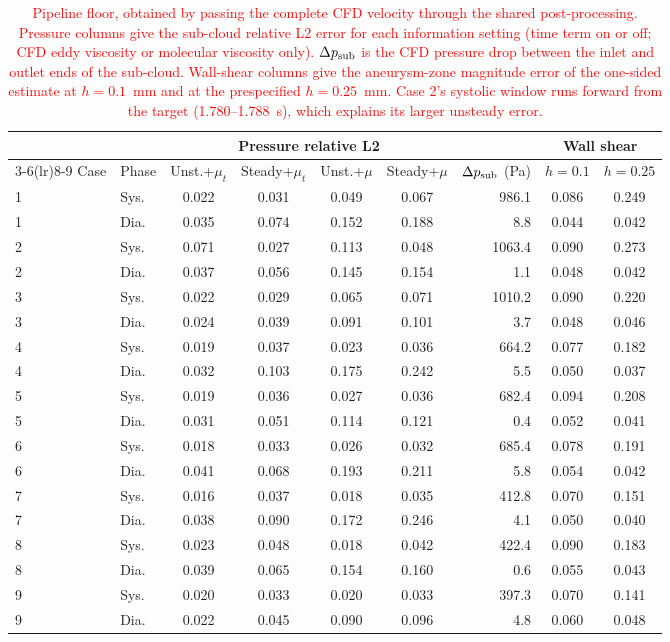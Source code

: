 \documentclass[12pt,a4paper]{article}
\theoremstyle{definition}
\numberwithin{equation}{section}
\begin{document}
\begin{table}[htbp]
\centering
\small
\setlength{\tabcolsep}{4pt}
\caption{\textcolor{red}{Pipeline floor, obtained by passing the complete CFD velocity through the shared post-processing. Pressure columns give the sub-cloud relative L2 error for each information setting (time term on or off; CFD eddy viscosity or molecular viscosity only). $\Delta p_{\rm sub}$ is the CFD pressure drop between the inlet and outlet ends of the sub-cloud. Wall-shear columns give the aneurysm-zone magnitude error of the one-sided estimate at $h=0.1$~mm and at the prespecified $h=0.25$~mm. Case 2's systolic window runs forward from the target (1.780--1.788~s), which explains its larger unsteady error.}}
\label{tab:reference_floor}
\begin{tabular}{llccccrcc}
\toprule
 & & \multicolumn{4}{c}{Pressure relative L2} & & \multicolumn{2}{c}{Wall shear} \\
\cmidrule(lr){3-6}\cmidrule(lr){8-9}
Case & Phase & Unst.+$\mu_t$ & Steady+$\mu_t$ & Unst.+$\mu$ & Steady+$\mu$ & $\Delta p_{\rm sub}$ (Pa) & $h=0.1$ & $h=0.25$ \\
\midrule
1 & Sys. & 0.022 & 0.031 & 0.049 & 0.067 & 986.1 & 0.086 & 0.249 \\
1 & Dia. & 0.035 & 0.074 & 0.152 & 0.188 & 8.8 & 0.044 & 0.042 \\
2 & Sys. & 0.071 & 0.027 & 0.113 & 0.048 & 1063.4 & 0.090 & 0.273 \\
2 & Dia. & 0.037 & 0.056 & 0.145 & 0.154 & 1.1 & 0.048 & 0.042 \\
3 & Sys. & 0.022 & 0.029 & 0.065 & 0.071 & 1010.2 & 0.090 & 0.220 \\
3 & Dia. & 0.024 & 0.039 & 0.091 & 0.101 & 3.7 & 0.048 & 0.046 \\
4 & Sys. & 0.019 & 0.037 & 0.023 & 0.036 & 664.2 & 0.077 & 0.182 \\
4 & Dia. & 0.032 & 0.103 & 0.175 & 0.242 & 5.5 & 0.050 & 0.037 \\
5 & Sys. & 0.019 & 0.036 & 0.027 & 0.036 & 682.4 & 0.094 & 0.208 \\
5 & Dia. & 0.031 & 0.051 & 0.114 & 0.121 & 0.4 & 0.052 & 0.041 \\
6 & Sys. & 0.018 & 0.033 & 0.026 & 0.032 & 685.4 & 0.078 & 0.191 \\
6 & Dia. & 0.041 & 0.068 & 0.193 & 0.211 & 5.8 & 0.054 & 0.042 \\
7 & Sys. & 0.016 & 0.037 & 0.018 & 0.035 & 412.8 & 0.070 & 0.151 \\
7 & Dia. & 0.038 & 0.090 & 0.172 & 0.246 & 4.1 & 0.050 & 0.040 \\
8 & Sys. & 0.023 & 0.048 & 0.018 & 0.042 & 422.4 & 0.090 & 0.183 \\
8 & Dia. & 0.039 & 0.065 & 0.154 & 0.160 & 0.6 & 0.055 & 0.043 \\
9 & Sys. & 0.020 & 0.033 & 0.020 & 0.033 & 397.3 & 0.070 & 0.141 \\
9 & Dia. & 0.022 & 0.045 & 0.090 & 0.096 & 4.8 & 0.060 & 0.048 \\
\bottomrule
\end{tabular}
\end{table}
\end{document}
